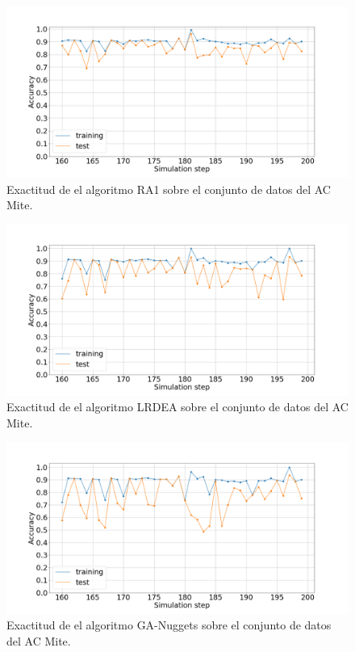 \begin{figure}[H]
	\centering
	\includegraphics[width=\linewidth]{fig/ra1_9}
	\caption{Exactitud de el algoritmo RA1 sobre el conjunto de datos del AC Mite.}
	\label{fig:ra1mite}
\end{figure}
\begin{figure}[H]
	\centering
	\includegraphics[width=\linewidth]{fig/LRDEA_10}
	\caption{Exactitud de el algoritmo LRDEA sobre el conjunto de datos del AC Mite.}
	\label{fig:lrdeamite}
\end{figure}

\begin{figure}[H]
	\centering
	\includegraphics[width=\linewidth]{fig/GA-nuggets_11}
	\caption{Exactitud de el algoritmo GA-Nuggets sobre el conjunto de datos del AC Mite.}
	\label{fig:ganuggetsmite}
\end{figure}



